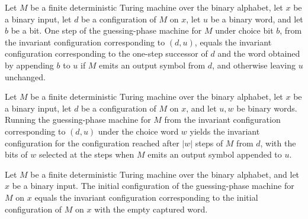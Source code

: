 \begin{lemma}
\label{Complexity.cont_guess_step}
\leanok
{}
Let $M$ be a finite deterministic Turing machine over the binary alphabet, let $x$ be a
binary input, let $d$ be a configuration of $M$ on $x$, let $u$ be a binary word, and
let $b$ be a bit. One step of the guessing-phase machine for $M$ under choice bit $b$,
from the invariant configuration corresponding to $(d,u)$, equals the invariant
configuration corresponding to the one-step successor of $d$ and the word obtained by
appending $b$ to $u$ if $M$ emits an output symbol from $d$, and otherwise leaving $u$
unchanged.
\end{lemma}

\begin{lemma}
\label{Complexity.cont_guess_run}
\leanok
{}
Let $M$ be a finite deterministic Turing machine over the binary alphabet, let $x$ be a
binary input, let $d$ be a configuration of $M$ on $x$, and let $u,w$ be binary words.
Running the guessing-phase machine for $M$ from the invariant configuration
corresponding to $(d,u)$ under the choice word $w$ yields the invariant configuration
for the configuration reached after $|w|$ steps of $M$ from $d$, with the bits of $w$
selected at the steps when $M$ emits an output symbol appended to $u$.
\end{lemma}

\begin{lemma}
\label{Complexity.cont_guess_initial}
\leanok
{}
Let $M$ be a finite deterministic Turing machine over the binary alphabet, and let $x$
be a binary input. The initial configuration of the guessing-phase machine for $M$ on
$x$ equals the invariant configuration corresponding to the initial configuration of $M$
on $x$ with the empty captured word.
\end{lemma}

